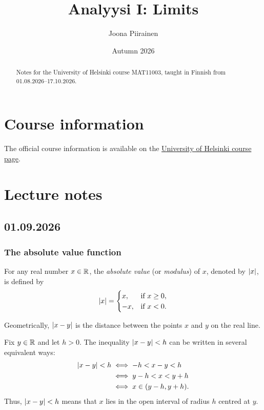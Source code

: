 \documentclass[11pt,a4paper]{amsart}
\title{Analyysi I: Limits}
\author{Joona Piirainen}
\date{Autumn 2026}
\begin{document}
\maketitle

\begin{abstract}
  Notes for the University of Helsinki course MAT11003, taught in Finnish
  from 01.08.2026--17.10.2026.
\end{abstract}

\tableofcontents

\section{Course information}

The official course information is available on the
\href{https://studies.helsinki.fi/kurssit/toteutus/hy-opt-cur-2627-0f6de353-53e0-4057-8e8e-b45cab4f2a8d}{University
of Helsinki course page}.

\section{Lecture notes}

\subsection{01.09.2026}

\subsubsection{The absolute value function}

\begin{definition}\label{def:abs}
  For any real number \(x \in \mathbb{R}\), the \emph{absolute value} (or
  \emph{modulus}) of \(x\), denoted by \(\lvert x\rvert\), is defined by
  \[
    \lvert x\rvert =
    \begin{cases}
      x,  & \text{if } x \geq 0, \\
      -x, & \text{if } x < 0.
    \end{cases}
  \]
\end{definition}

Geometrically, \(\lvert x-y\rvert\) is the distance between the points \(x\) and \(y\)
on the real line.

\begin{example}
  Fix \(y \in \mathbb{R}\) and let \(h>0\). The inequality \(\lvert x-y\rvert<h\) can be
  written in several equivalent ways:
  \begin{align*}
    \lvert x-y\rvert<h
    &\iff -h<x-y<h \\
    &\iff y-h<x<y+h \\
    &\iff x\in(y-h,y+h).
  \end{align*}
  Thus, \(\lvert x-y\rvert<h\) means that \(x\) lies in the open interval of radius
  \(h\) centred at \(y\).
\end{example}
\end{document}
